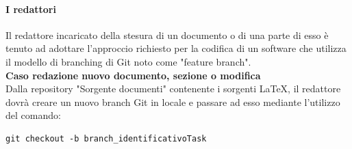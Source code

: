 \documentclass{article}
\begin{document}



\paragraph{I redattori}

Il redattore incaricato della stesura di un documento o di una parte di esso è tenuto ad adottare l'approccio richiesto per la codifica di un software che utilizza il modello di branching di Git noto come "feature branch".\\
\vspace{0.1cm}
\textbf{Caso redazione nuovo documento, sezione o modifica}\\
Dalla repository  "Sorgente documenti" contenente i sorgenti \LaTeX, il redattore dovrà creare un nuovo branch Git in locale e passare ad esso mediante l'utilizzo del comando:
\begin{lstlisting}[style=code]
    git checkout -b branch_identificativoTask 
    \end{lstlisting}
\end{document}
